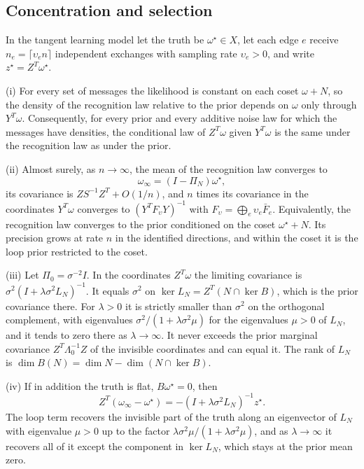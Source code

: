 \subsection{Concentration and selection}

In the tangent learning model let the truth be $\omega^\star\in X$, let each edge $e$ receive $n_e=\lceil\upsilon_en\rceil$ independent exchanges with sampling rate $\upsilon_e>0$, and write $z^\star=Z^T\omega^\star$.

\textup{(i)} For every set of messages the likelihood is constant on each coset $\omega+N$, so the density of the recognition law relative to the prior depends on $\omega$ only through $Y^T\omega$. Consequently, for every prior and every additive noise law for which the messages have densities, the conditional law of $Z^T\omega$ given $Y^T\omega$ is the same under the recognition law as under the prior.

\textup{(ii)} Almost surely, as $n\to\infty$, the mean of the recognition law converges to
\begin{equation}
\omega_\infty=(I-\Pi_N)\omega^\star,
\label{it1:limit-mean}
\end{equation}
its covariance is $ZS^{-1}Z^T+O(1/n)$, and $n$ times its covariance in the coordinates $Y^T\omega$ converges to $(Y^TF_\upsilon Y)^{-1}$ with $F_\upsilon=\bigoplus_e\upsilon_e\bar F_e$. Equivalently, the recognition law converges to the prior conditioned on the coset $\omega^\star+N$. Its precision grows at rate $n$ in the identified directions, and within the coset it is the loop prior restricted to the coset.

\textup{(iii)} Let $\Pi_0=\sigma^{-2}I$. In the coordinates $Z^T\omega$ the limiting covariance is $\sigma^2(I+\lambda\sigma^2L_N)^{-1}$. It equals $\sigma^2$ on $\ker L_N=Z^T(N\cap\ker B)$, which is the prior covariance there. For $\lambda>0$ it is strictly smaller than $\sigma^2$ on the orthogonal complement, with eigenvalues $\sigma^2/(1+\lambda\sigma^2\mu)$ for the eigenvalues $\mu>0$ of $L_N$, and it tends to zero there as $\lambda\to\infty$. It never exceeds the prior marginal covariance $Z^T\Lambda_0^{-1}Z$ of the invisible coordinates and can equal it. The rank of $L_N$ is $\dim B(N)=\dim N-\dim(N\cap\ker B)$.

\textup{(iv)} If in addition the truth is flat, $B\omega^\star=0$, then
\begin{equation}
Z^T(\omega_\infty-\omega^\star)=-(I+\lambda\sigma^2L_N)^{-1}z^\star.
\label{it1:shrinkage}
\end{equation}
The loop term recovers the invisible part of the truth along an eigenvector of $L_N$ with eigenvalue $\mu>0$ up to the factor $\lambda\sigma^2\mu/(1+\lambda\sigma^2\mu)$, and as $\lambda\to\infty$ it recovers all of it except the component in $\ker L_N$, which stays at the prior mean zero.

